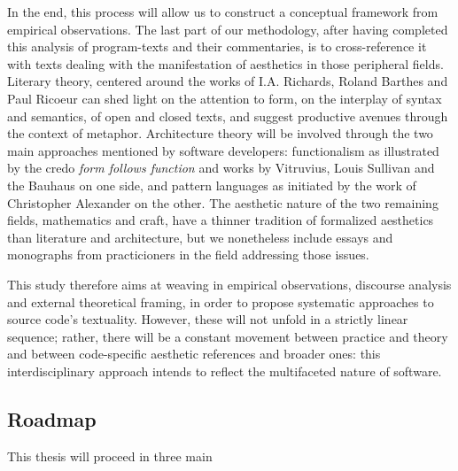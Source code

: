 In the end, this process will allow us to construct a conceptual framework from empirical observations. The last part of our methodology, after having completed this analysis of program-texts and their commentaries, is to cross-reference it with texts dealing with the manifestation of aesthetics in those peripheral fields. Literary theory, centered around the works of I.A. Richards, Roland Barthes and Paul Ricoeur can shed light on the attention to form, on the interplay of syntax and semantics, of open and closed texts, and suggest productive avenues through the context of metaphor. Architecture theory will be involved through the two main approaches mentioned by software developers: functionalism as illustrated by the credo \emph{form follows function} and works by Vitruvius, Louis Sullivan and the Bauhaus on one side, and pattern languages as initiated by the work of Christopher Alexander on the other. The aesthetic nature of the two remaining fields, mathematics and craft, have a thinner tradition of formalized aesthetics than literature and architecture, but we nonetheless include essays and monographs from practicioners in the field addressing those issues.

This study therefore aims at weaving in empirical observations, discourse analysis and external theoretical framing, in order to propose systematic approaches to source code's textuality. However, these will not unfold in a strictly linear sequence; rather, there will be a constant movement between practice and theory and between code-specific aesthetic references and broader ones: this interdisciplinary approach intends to reflect the multifaceted nature of software.

\subsection{Roadmap}

This thesis will proceed in three main

